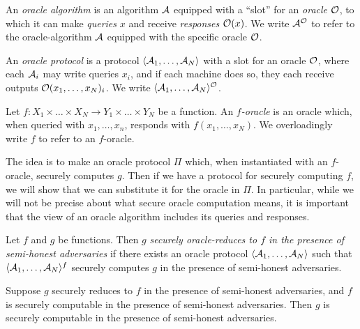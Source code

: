 \begin{dfn}
  An \emph{oracle algorithm} is an algorithm $\mathcal{A}$ equipped with a ``slot'' for
  an \emph{oracle} $\mathcal{O}$, to which it can make \emph{queries} $x$ and receive
  \emph{responses} $\mathcal{O}(x)$. We write $\mathcal{A}^{\mathcal{O}}$ to refer to the
  oracle-algorithm $\mathcal{A}$ equipped with the specific oracle $\mathcal{O}$.

  An \emph{oracle protocol} is a protocol $\langle\mathcal{A}_1,\dots,\mathcal{A}_N\rangle$ with a slot
  for an oracle $\mathcal{O}$, where each $\mathcal{A}_i$ may write queries $x_i$, and if each
  machine does so, they each receive outputs $\mathcal{O}(x_1,\dots, x_N)_i$. We write
  $\langle\mathcal{A}_1,\dots,\mathcal{A}_N\rangle^{\mathcal{O}}$.

  Let $f: X_1\times\dots\times X_N\to Y_1\times\dots\times Y_N$ be a function.
  An \emph{$f$-oracle} is an oracle which, when queried with $x_1,\dots,x_n$,
  responds with $f(x_1,\dots,x_N)$. We overloadingly write $f$ to refer to an
  $f$-oracle.
\end{dfn}

The idea is to make an oracle protocol $\Pi$ which, when instantiated with an
$f$-oracle, securely computes $g$. Then if we have a protocol for securely
computing $f$, we will show that we can substitute it for the oracle in $\Pi$.
In particular, while we will not be precise about what secure oracle computation
means, it is important that the view of an oracle algorithm includes its queries and responses.

\begin{dfn}
  Let $f$ and $g$ be functions. Then $g$ \emph{securely oracle-reduces to $f$ in the presence of semi-honest
  adversaries} if there exists an oracle protocol $\langle\mathcal{A}_1,\dots,\mathcal{A}_N\rangle$ such
  that $\langle\mathcal{A}_1,\dots,\mathcal{A}_N\rangle^f$ securely computes $g$ in the presence of
  semi-honest
  adversaries.
\end{dfn}

\begin{thm}\label{thm:oracle-sequential-composition}
  Suppose $g$ securely reduces to $f$ in the presence of semi-honest
  adversaries, and $f$ is securely computable in the presence of semi-honest
  adversaries. Then $g$ is securely computable in the presence of semi-honest
  adversaries.
\end{thm}

